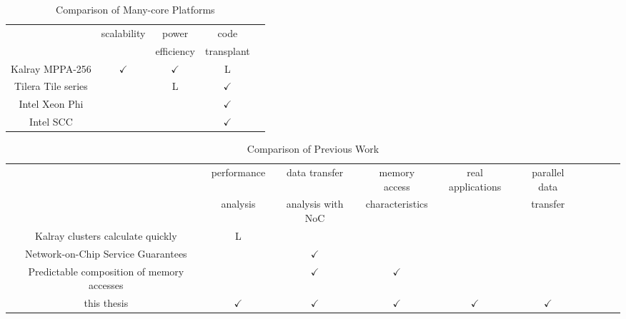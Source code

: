 \begin{landscape}
  \begin{table}[thbp]
    \caption{\label{tb:comparison_manycore}
      Comparison of Many-core Platforms}
    \centering
    \begin{tabular}{c|cccc}
      \hline
      & \multirow{2}{*}{scalability} & power  & code & \\
      & & efficiency & transplant & \\
      \hline
      \hline
      Kalray MPPA-256 \cite{de2014time} & \(\checkmark\) & \(\checkmark\) & L & \\
      Tilera Tile series \cite{bell2008tile64} &  & L & \(\checkmark\) & \\
      Intel Xeon Phi \cite{chrysos2014intel} \cite{chrysos2012intel} &  &  & \(\checkmark\) & \\
      Intel SCC \cite{baron2010single} &  &  & \(\checkmark\) & \\
      \hline
    \end{tabular}
  \end{table}  
  \begin{table}[thbp]
    \caption{\label{tb:comparison_relatedwork}
      Comparison of Previous Work}
    \centering
    \scriptsize	                    %
    \begin{tabular}{c|ccccccccc}
      \hline
      & performance & data transfer & memory access & \multirow{2}{*}{real applications} & parallel data & \\
      & analysis & analysis with NoC & characteristics & & transfer & \\
      \hline
      \hline
      Kalray clusters calculate quickly \cite{kanter2015kalray} & L &  &  &  &  & \\
      Network-on-Chip Service Guarantees \cite{denet2017work} &  & \(\checkmark\) &  &  &  & \\
      Predictable composition of memory accesses \cite{perret2016predictable} &  & \(\checkmark\) & \(\checkmark\) &  &  & \\
      this thesis & \(\checkmark\) & \(\checkmark\) & \(\checkmark\) & \(\checkmark\) & \(\checkmark\) & \\
      \hline
    \end{tabular}
  \end{table}
\end{landscape}


